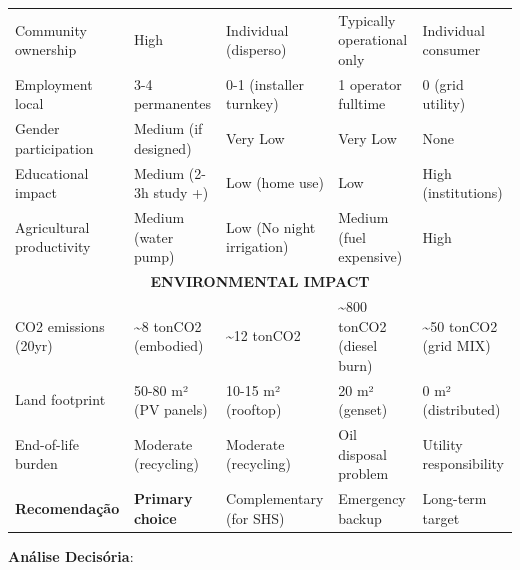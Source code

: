 \documentclass[12pt, a4paper]{article}
\begin{document}
\begin{table}[H]
{\begin{tabular}{lllll}
\midrule
Community ownership & High & Individual (disperso) & Typically operational only & Individual consumer \\
Employment local & 3-4 permanentes & 0-1 (installer turnkey) & 1 operator fulltime & 0 (grid utility) \\
Gender participation & Medium (if designed) & Very Low & Very Low & None \\
Educational impact & Medium (2-3h study +) & Low (home use) & Low & High (institutions) \\
Agricultural productivity & Medium (water pump) & Low (No night irrigation) & Medium (fuel expensive) & High \\
\midrule
\multicolumn{5}{c}{\textbf{ENVIRONMENTAL IMPACT}} \\
\midrule
CO2 emissions (20yr) & \textasciitilde{}8 tonCO2 (embodied) & \textasciitilde{}12 tonCO2 & \textasciitilde{}800 tonCO2 (diesel burn) & \textasciitilde{}50 tonCO2 (grid MIX) \\
Land footprint & 50-80 m² (PV panels) & 10-15 m² (rooftop) & 20 m² (genset) & 0 m² (distributed) \\
End-of-life burden & Moderate (recycling) & Moderate (recycling) & Oil disposal problem & Utility responsibility \\
\midrule
\textbf{Recomendação} & \textbf{Primary choice} & Complementary (for SHS) & Emergency backup & Long-term target \\
\bottomrule
\end{tabular}}
\end{table}

\textbf{Análise Decisória}:
\end{document}
